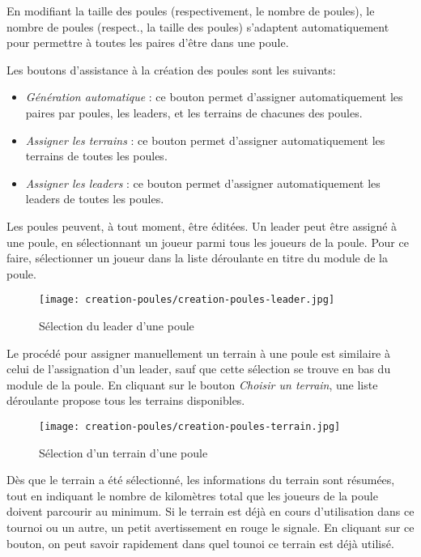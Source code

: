 En modifiant la taille des poules (respectivement, le nombre de poules), le nombre de poules (respect., la taille des poules) s'adaptent automatiquement pour permettre à toutes les paires d'être dans une poule.\newline

Les boutons d'assistance à la création des poules sont les suivants:

\begin{itemize}
\item \textit{Génération automatique} : ce bouton permet d'assigner automatiquement les paires par poules, les leaders, et les terrains de chacunes des poules.
\item \textit{Assigner les terrains} : ce bouton permet d'assigner automatiquement les terrains de toutes les poules.
\item \textit{Assigner les leaders} : ce bouton permet d'assigner automatiquement les leaders de toutes les poules.
\end{itemize}
\bigskip

Les poules peuvent, à tout moment, être éditées. Un leader peut être assigné à une poule, en sélectionnant un joueur parmi tous les joueurs de la poule. Pour ce faire, sélectionner un joueur dans la liste déroulante en titre du module de la poule.

\begin{figure}[H]
\centering
\texttt{[image: creation-poules/creation-poules-leader.jpg]}
\caption{Sélection du leader d'une poule}
\end{figure}

\bigskip

Le procédé pour assigner manuellement un terrain à une poule est similaire à celui de l'assignation d'un leader, sauf que cette sélection se trouve en bas du module de la poule. En cliquant sur le bouton \textit{Choisir un terrain}, une liste déroulante propose tous les terrains disponibles.

\begin{figure}[H]
\centering
\texttt{[image: creation-poules/creation-poules-terrain.jpg]}
\caption{Sélection d'un terrain d'une poule}
\end{figure}

Dès que le terrain a été sélectionné, les informations du terrain sont résumées, tout en indiquant le nombre de kilomètres total que les joueurs de la poule doivent parcourir au minimum. Si le terrain est déjà en cours d'utilisation dans ce tournoi ou un autre, un petit avertissement en rouge le signale. En cliquant sur ce bouton, on peut savoir rapidement dans quel tounoi ce terrain est déjà utilisé.

